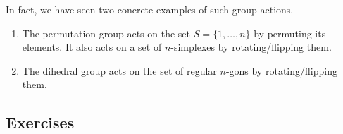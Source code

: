   \begin{example}
    \label{ex:permutations-and-dihedral-groups-as-group}
    In fact, we have seen two concrete examples of such group actions. 
    \begin{enumerate}
      \item The permutation group acts on the set $S = \{1, \ldots, n\}$ by permuting its elements. It also acts on a set of $n$-simplexes by rotating/flipping them. 
      \item The dihedral group acts on the set of regular $n$-gons by rotating/flipping them. 
    \end{enumerate}
  \end{example}

\subsection{Exercises}
